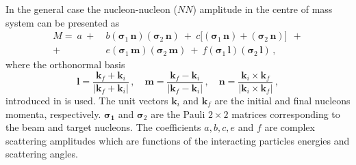 \documentclass[twocolumn,epjc3]{svjour3}
\begin{document}
In the general case the nucleon-nucleon ($NN$) amplitude in the centre of mass
system can be presented as \cite{gla02}
\begin{equation}
  \label{eq:mat_full}
  \begin{split}
    M =\ a\ +\ &b
    (\boldsymbol{\sigma}_1\,\mathbf{n})
    (\boldsymbol{\sigma}_2\,\mathbf{n})\ +\ c\bigl[
    (\boldsymbol{\sigma}_1\,\mathbf{n}) +
    (\boldsymbol{\sigma}_2\,\mathbf{n})\bigr]\ \ + \\
    +\ &e
    (\boldsymbol{\sigma}_1\,\mathbf{m})
    (\boldsymbol{\sigma}_2\,\mathbf{m})\ +\ f
    (\boldsymbol{\sigma}_1\,\mathbf{l})
    (\boldsymbol{\sigma}_2\,\mathbf{l})\,,
  \end{split}
\end{equation}
where the orthonormal basis
\begin{equation}
  \mathbf{l} =
  \frac{\mathbf{k}_f + \mathbf{k}_i}{|\mathbf{k}_f + \mathbf{k}_i|}\,, \quad
  \mathbf{m} =
  \frac{\mathbf{k}_f - \mathbf{k}_i}{|\mathbf{k}_f - \mathbf{k}_i|}\,, \quad
  \mathbf{n} =
  \frac{\mathbf{k}_i \times \mathbf{k}_f}{|\mathbf{k}_i \times \mathbf{k}_f|}\,,
\end{equation}
introduced in \cite{gol66} is used. The unit vectors $\mathbf{k}_i$ and
$\mathbf{k}_f$ are the initial and final nucleons momenta, respectively.
$\boldsymbol{\sigma_1}$ and $\boldsymbol{\sigma}_2$ are the Pauli $2\times2$
matrices corresponding to the beam and target nucleons. The coefficients
$a, b, c, e$ and $f$ are complex scattering amplitudes which are functions of
the interacting particles energies and scattering angles.

\end{document}
